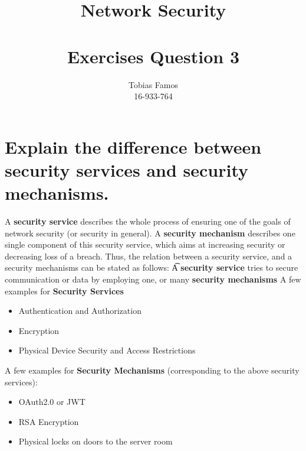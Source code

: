 \documentclass[11pt,a4paper]{article}
\title{Network Security \\ ~\\ \Large{Exercises Question 3}}
\author{Tobias Famos\\ 16-933-764}
\begin{document}
    \maketitle
    \section*{Explain the difference between security services and security mechanisms.}

    A \textbf{security service} describes the whole process of ensuring one of the goals of network security (or security in general).
    A \textbf{security mechanism} describes one single component of this security service, which aims at increasing security or decreasing loss of a breach.
    Thus, the relation between a security service, and a security mechanisms can be stated as follows:
     \t A \textbf{security service} tries to secure communication or data by employing one, or many \textbf{security mechanisms}
    A few examples for \textbf{Security Services}
    \begin{itemize}
        \item Authentication and Authorization
        \item Encryption
        \item Physical Device Security and Access Restrictions
    \end{itemize}
    A few examples for \textbf{Security Mechanisms} (corresponding to the above security services):
    \begin{itemize}
        \item OAuth2.0 or JWT
        \item RSA Encryption
        \item Physical locks on doors to the server room
    \end{itemize}
\end{document}
